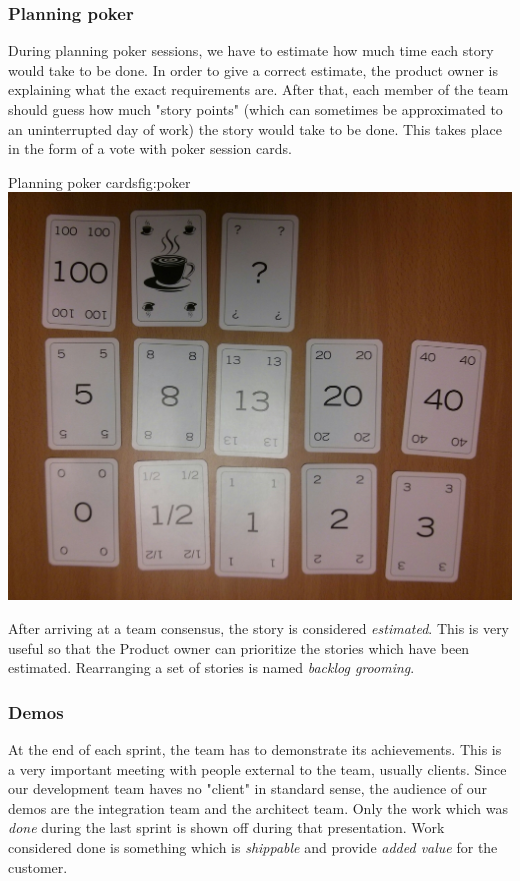 \subsubsection{Planning poker}
During planning poker sessions, we have to estimate how much time each story
would take to be done. In order to give a correct estimate, the product owner is
explaining what the exact requirements are. After that, each member of the team
should guess how much "story points" (which can sometimes be approximated to an
uninterrupted day of work) the story would take to be done. This takes place in the
form of a vote with poker session cards.

\begin{figureGraphics}{Planning poker cards}{fig:poker}
    \includegraphics[width=\textwidth]{./src/img/poker.jpg}
\end{figureGraphics}

After arriving at a team consensus, the story is considered \emph{estimated}. This
is very useful so that the Product owner can prioritize the stories which have
been estimated. Rearranging a set of stories is named \emph{backlog grooming}.


\subsubsection{Demos}
At the end of each sprint, the team has to demonstrate its achievements. This
is a very important meeting with people external to the team, usually clients.
Since our development team haves no "client" in standard sense, the audience of our demos are
the integration team and the architect team.
Only the work which was \emph{done} during the last sprint is shown off during that presentation.
Work considered done is something which is \emph{shippable} and provide \emph{added value} for the customer.

